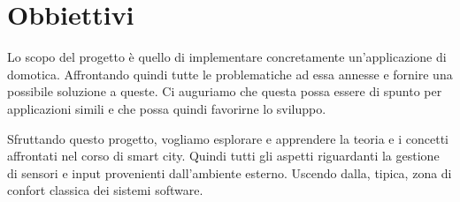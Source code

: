 \section{Obbiettivi}

Lo scopo del progetto è quello di implementare concretamente un'applicazione di domotica. Affrontando quindi tutte le problematiche ad essa annesse e fornire una possibile soluzione a queste. Ci auguriamo che questa possa essere di spunto per applicazioni simili e che possa quindi favorirne lo sviluppo.

Sfruttando questo progetto, vogliamo esplorare e apprendere la teoria e i concetti affrontati nel corso di smart city. Quindi tutti gli aspetti riguardanti la gestione di sensori e input provenienti dall'ambiente esterno. Uscendo dalla, tipica, zona di confort classica dei sistemi software.


\newpage


